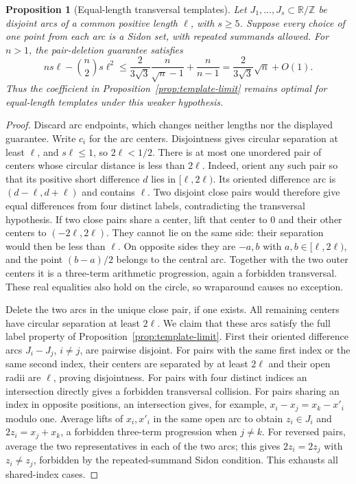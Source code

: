 \documentclass[11pt]{article}
\newtheorem{proposition}[theorem]{Proposition}
\theoremstyle{definition}
\theoremstyle{remark}
\newcommand{\T}{\mathbb R/\mathbb Z}
\begin{document}
\begin{proposition}[Equal-length transversal templates]\label{prop:transversal-template-limit}
Let $J_1,\ldots,J_s\subset\T$ be disjoint arcs of a common positive
length $\ell$, with $s\ge5$. Suppose every choice of one point from
each arc is a Sidon set, with repeated summands allowed. For $n>1$,
the pair-deletion guarantee satisfies
\[
ns\ell-\binom n2s\ell^2
\le \frac{2}{3\sqrt3}\frac{n}{\sqrt n-1}
       +\frac{n}{n-1}
=\frac{2}{3\sqrt3}\sqrt n+O(1).
\]
Thus the coefficient in Proposition~\ref{prop:template-limit} remains
optimal for equal-length templates under this weaker hypothesis.
\end{proposition}
\begin{proof}
Discard arc endpoints, which changes neither lengths nor the displayed
guarantee. Write $c_i$ for the arc centers. Disjointness gives circular
separation at least $\ell$, and $s\ell\le1$, so $2\ell<1/2$.
There is at most one unordered pair of centers whose circular distance
is less than $2\ell$. Indeed, orient any such pair so that its positive
short difference $d$ lies in $[\ell,2\ell)$. Its oriented difference
arc is $(d-\ell,d+\ell)$ and contains $\ell$. Two disjoint close pairs
would therefore give equal differences from four distinct labels,
contradicting the transversal hypothesis. If two close pairs share a
center, lift that center to $0$ and their other centers to
$(-2\ell,2\ell)$. They cannot lie on the same side: their separation
would then be less than $\ell$. On opposite sides they are $-a,b$ with
$a,b\in[\ell,2\ell)$, and the point $(b-a)/2$ belongs to the central
arc. Together with the two outer centers it is a three-term arithmetic
progression, again a forbidden transversal. These real equalities also
hold on the circle, so wraparound causes no exception.

Delete the two arcs in the unique close pair, if one exists. All remaining
centers have circular separation at least $2\ell$. We claim that these
arcs satisfy the full label property of
Proposition~\ref{prop:template-limit}. First their oriented difference
arcs $J_i-J_j$, $i\ne j$, are pairwise disjoint. For pairs with the same
first index or the same second index, their centers are separated by at
least $2\ell$ and their open radii are $\ell$, proving disjointness.
For pairs with four distinct indices an intersection directly gives
a forbidden transversal collision. For pairs sharing an index in
opposite positions, an intersection gives, for example,
$x_i-x_j=x_k-x'_i$ modulo one. Average lifts of $x_i,x'_i$ in the same
open arc to obtain $z_i\in J_i$ and $2z_i=x_j+x_k$, a forbidden
three-term progression when $j\ne k$. For reversed pairs, average
the two representatives in each of the two arcs; this gives
$2z_i=2z_j$ with $z_i\ne z_j$, forbidden by the repeated-summand
Sidon condition. This exhausts all shared-index cases.


\end{proof}
\end{document}
